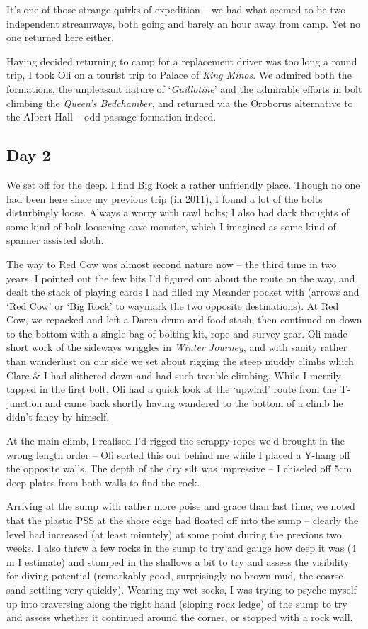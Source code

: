 It's one of those strange quirks of expedition -- we had what seemed to
be two independent streamways, both going and barely an hour away from
camp. Yet no one returned here either.

Having decided returning to camp for a replacement driver was too long a
round trip, I took Oli on a tourist trip to Palace of \emph{King Minos}.
We admired both the formations, the unpleasant nature of
`\emph{Guillotine}' and the admirable efforts in bolt climbing the
\emph{Queen's Bedchamber}, and returned via the Oroborus alternative to
the Albert Hall -- odd passage formation indeed.


\subsection{Day 2}

We set off for the deep. I find Big Rock a rather unfriendly place.
Though no one had been here since my previous trip (in 2011), I found a
lot of the bolts disturbingly loose. Always a worry with rawl bolts; I
also had dark thoughts of some kind of bolt loosening cave monster,
which I imagined as some kind of spanner assisted sloth.

The way to Red Cow was almost second nature now -- the third time in two
years. I pointed out the few bits I'd figured out about the route on the
way, and dealt the stack of playing cards I had filled my Meander pocket
with (arrows and `Red Cow' or `Big Rock' to waymark the two opposite
destinations). At Red Cow, we repacked and left a Daren drum and food
stash, then continued on down to the bottom with a single bag of bolting
kit, rope and survey gear. Oli made short work of the sideways wriggles
in \emph{Winter Journey}, and with sanity rather than wanderlust on our
side we set about rigging the steep muddy climbs which Clare \& I had
slithered down and had such trouble climbing. While I merrily tapped in
the first bolt, Oli had a quick look at the `upwind' route from the
T-junction and came back shortly having wandered to the bottom of a
climb he didn't fancy by himself.

At the main climb, I realised I'd rigged the scrappy ropes we'd brought
in the wrong length order -- Oli sorted this out behind me while I
placed a Y-hang off the opposite walls. The depth of the dry silt was
impressive -- I chiseled off 5cm deep plates from both walls to find the
rock.

Arriving at the sump with rather more poise and grace than last time, we
noted that the plastic PSS at the shore edge had floated off into the
sump -- clearly the level had increased (at least minutely) at some
point during the previous two weeks. I also threw a few rocks in the
sump to try and gauge how deep it was (4 m I estimate) and stomped in
the shallows a bit to try and assess the visibility for diving potential
(remarkably good, surprisingly no brown mud, the coarse sand settling
very quickly). Wearing my wet socks, I was trying to psyche myself up
into traversing along the right hand (sloping rock ledge) of the sump to
try and assess whether it continued around the corner, or stopped with a
rock wall.

